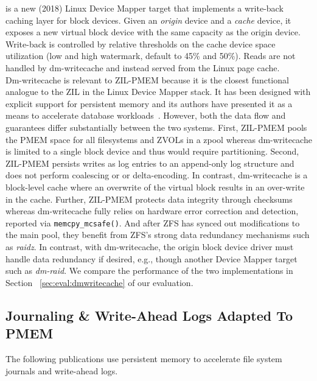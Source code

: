 \documentclass[12pt,a4paper,twoside]{book}
\begin{document}
 is a new (2018) Linux Device Mapper target that implements a write-back caching layer for block devices.
Given an \textit{origin} device and a \textit{cache} device, it exposes a new virtual block device with the same capacity as the origin device.
Write-back is controlled by relative thresholds on the cache device space utilization (low and high watermark, default to 45\% and 50\%).
Reads are not handled by dm-writecache and instead served from the Linux page cache.~\cite{WritecacheTargetLinux}
\\
Dm-writecache is relevant to ZIL-PMEM because it is the closest functional analogue to the ZIL in the Linux Device Mapper stack.
It has been designed with explicit support for persistent memory and its authors have presented it as a means to accelerate database workloads~\cite{tadakamadlaAcceleratingDatabaseWorkloads2019}.
However, both the data flow and guarantees differ substantially between the two systems.
First, ZIL-PMEM pools the PMEM space for all filesystems and ZVOLs in a zpool whereas dm-writecache is limited to a single block device and thus would require partitioning.
Second, ZIL-PMEM persists writes as log entries to an append-only log structure and does not perform coalescing or or delta-encoding.
In contrast, dm-writecache is a block-level cache where an overwrite of the virtual block results in an over-write in the cache.
Further, ZIL-PMEM protects data integrity through checksums whereas dm-writecache fully relies on hardware error correction and detection, reported via \lstinline{memcpy_mcsafe()}.
And after ZFS has synced out modifications to the main pool, they benefit from ZFS's strong data redundancy mechanisms such as \textit{raidz}.
In contrast, with dm-writecache, the origin block device driver must handle data redundancy if desired, e.g., though another Device Mapper target such as \textit{dm-raid}.
We compare the performance of the two implementations in Section ~\ref{sec:eval:dmwritecache} of our evaluation.

\subsection{Journaling \& Write-Ahead Logs Adapted To PMEM}
The following publications use persistent memory to accelerate file system journals and write-ahead logs.
\end{document}
